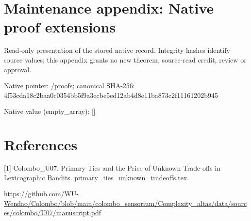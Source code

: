 \documentclass[10pt,a4paper]{article}
\begin{document}
\section{Maintenance appendix: Native proof extensions}


Read-only presentation of the stored native record. Integrity hashes identify source values; this appendix grants no new theorem, source-read credit, review or approval.



Native pointer: /proofs; canonical SHA-256: 4f53cda18c2baa0c0354bb5f\allowbreak{}9a3ecbe5ed12ab4d8e11ba87\allowbreak{}3c2f11161202b945



Native value (empty\_array): []



\section{References}


[1] Colombo\_U07. Primary Ties and the Price of Unknown Trade-offs in Lexicographic Bandits. primary\_ties\_unknown\_tradeoffs.tex.



\url{https://github.com/WU-Wendao/Colombo/blob/main/colombo_sensorium/Complexity_altas/data/sources/colombo/U07/manuscript.pdf}
\end{document}
